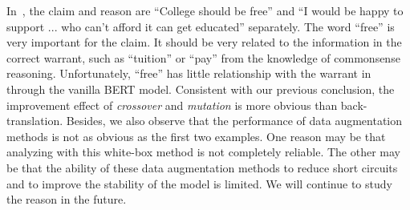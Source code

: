 In~, the claim and reason are ``College should be free'' and 
``I would be happy to support ... who can't afford it can get educated'' separately. 
The word ``free'' is very important for the claim. 
It should be very related to the information in the correct warrant, 
such as ``tuition'' or ``pay'' from the knowledge of commonsense reasoning. 
Unfortunately, ``free'' has little relationship with the warrant in~
through the vanilla BERT model. 
Consistent with our previous conclusion, 
the improvement effect of \textit{crossover} and \textit{mutation} 
is more obvious than back-translation. 
Besides, we also observe that the performance of data augmentation methods 
is not as obvious as the first two examples. 
One reason may be that analyzing with this white-box method is not completely reliable. 
The other may be that the ability of these data augmentation methods to reduce short circuits 
and to improve the stability of the model is limited. 
We will continue to study the reason in the future.


